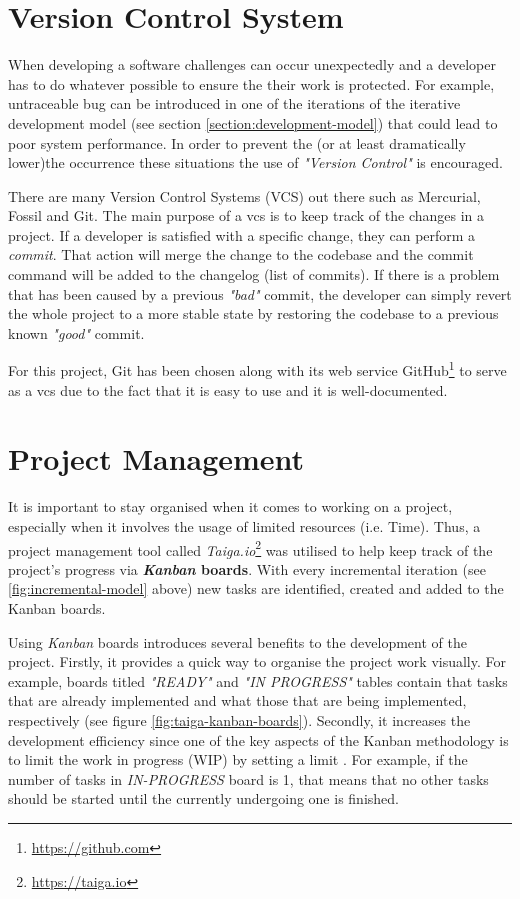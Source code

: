 \section{Version Control System}
When developing a software challenges can occur unexpectedly and a developer has to do whatever possible to ensure the their work is protected. For example, untraceable bug can be introduced in one of the iterations of the iterative development model (see section \ref{section:development-model}) that could lead to poor system performance. In order to prevent the (or at least dramatically lower)the occurrence these situations the use of \textit{"Version Control"} is encouraged.

There are many Version Control Systems (VCS) out there such as Mercurial, Fossil and Git. The main purpose of a \gls{vcs} is to keep track of the changes in a project. If a developer is satisfied with a specific change, they can perform a \textit{commit}. That action will merge the change to the codebase and the commit command will be added to the changelog (list of commits). If there is a problem that has been caused by a previous \textit{"bad"} commit, the developer can simply revert the whole project to a more stable state by restoring the codebase to a previous known \textit{"good"} commit.

For this project, Git has been chosen along with its web service GitHub\footnote{\url{https://github.com}} to serve as a \gls{vcs} due to the fact that it is easy to use and it is well-documented.


\section{Project Management}
It is important to stay organised when it comes to working on a project, especially when it involves the usage of limited resources (i.e. Time). Thus, a project management tool called \textit{Taiga.io}\footnote{\url{https://taiga.io}} was utilised to help keep track of the project's progress via \textbf{\textit{Kanban} boards}. With every incremental iteration (see \ref{fig:incremental-model} above) new tasks are identified, created and added to the Kanban boards.

Using \textit{Kanban} boards introduces several benefits to the development of the project. Firstly, it provides a quick way to organise the project work visually. For example, boards titled \textit{"READY"} and \textit{"IN PROGRESS"} tables contain that tasks that are already implemented and what those that are being implemented, respectively (see figure \ref{fig:taiga-kanban-boards}). Secondly, it increases the development efficiency since one of the key aspects of the Kanban methodology is to limit the work in progress (WIP) by setting a limit \citep[]{atlassian2017}. For example, if the number of tasks in \textit{IN-PROGRESS} board is 1, that means that no other tasks should be started until the currently undergoing one is finished.

